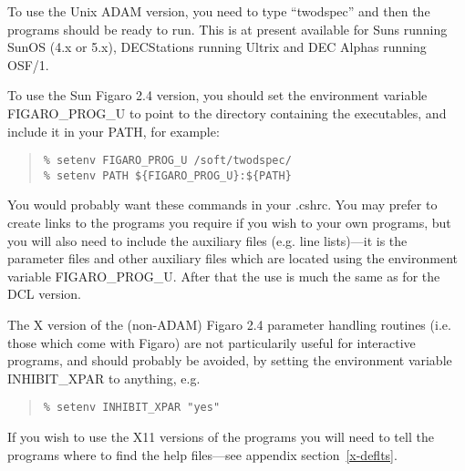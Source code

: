 To use the Unix ADAM version, you need to type ``twodspec'' and then the
programs should be ready to run. This is at present available for Suns running
SunOS (4.x or 5.x), DECStations running Ultrix and DEC Alphas running OSF/1.

To use the Sun Figaro 2.4 version, you should set the environment variable
FIGARO\_PROG\_U to point to the directory containing the executables,
and include it in your PATH, for example:
\begin{quote}\begin{verbatim}
% setenv FIGARO_PROG_U /soft/twodspec/
% setenv PATH ${FIGARO_PROG_U}:${PATH}
\end{verbatim}\end{quote}
You would probably want these commands in your .cshrc.
You may prefer to create links to the programs you require if you wish
to your own programs, but you will also need to include the auxiliary
files (e.g. line lists)---it is the parameter files and other auxiliary
files which are located using the environment variable FIGARO\_PROG\_U.
After that the use is much the same as for the DCL version.

The X version of the (non-ADAM) Figaro 2.4 parameter handling routines
(i.e. those which come with Figaro) are not particularily useful for
interactive programs, and should probably be avoided, by setting the
environment variable INHIBIT\_XPAR to anything, e.g.
\begin{quote}\begin{verbatim}
% setenv INHIBIT_XPAR "yes"
\end{verbatim}\end{quote}

If you wish to use the X11 versions of the programs you will need to tell the
programs where to find the help files---see appendix section~\ref{x-deflts}.

